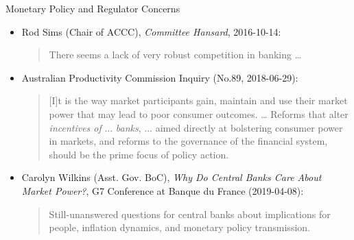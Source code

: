 \documentclass[10pt,english,slidetop,compress,
              blue,mathserif,color=option]{beamer}
\theoremstyle{plain}
\theoremstyle{definition}
\begin{document}
\begin{frame}{Monetary Policy and Regulator Concerns}


      
      

      \begin{itemize}
        \item Rod Sims (Chair of ACCC), 
        {\color{gray}
         \emph{Committee Hansard}, 2016-10-14: 
        }
        \medskip

        \begin{quote}
          There seems a lack of very robust competition in banking \dots 
        \end{quote}
      
        \item Australian Productivity Commission Inquiry 
        {\color{gray}
          (No.89, 2018-06-29):
        }
        \medskip

          \begin{quote}
            [I]t is the way market participants gain, maintain and use their market power that may lead to poor consumer outcomes.
            \dots
            Reforms that alter \emph{incentives of} ... \emph{banks}, ... aimed directly at bolstering consumer power in markets, and reforms to the governance of the financial system, should be the prime focus of policy action.
          \end{quote}
    \end{itemize}

    \begin{itemize}
      \item Carolyn Wilkins (Asst. Gov. BoC), 
      {\color{gray}
        \emph{Why Do Central Banks Care About Market Power?}, G7 Conference at Banque du France (2019-04-08):
      }
      \medskip

          \begin{quote}
            Still-unanswered questions for central banks about
            implications for people, inflation dynamics, and
            monetary policy transmission.
          \end{quote}
    \end{itemize}
\end{frame}
\end{document}
